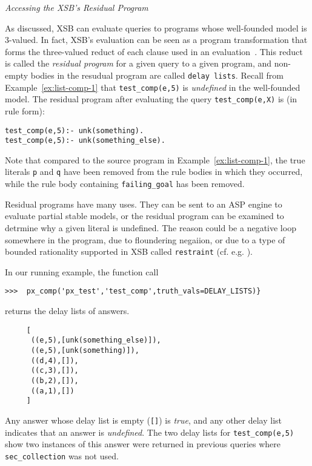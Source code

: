\begin{example} \rm {\it Accessing the XSB's Residual Program} \label{ex:px-comp-undef}

As discussed, XSB can evaluate queries to programs whose well-founded
model is 3-valued.  In fact, XSB's evaluation can be seen as a program
transformation that forms the three-valued reduct of each clause used
in an evaluation~\cite{ChWa96}.  This reduct is called the {\em
  residual program} for a given query to a given program, and
non-empty bodies in the resudual program are called {\tt delay lists}.
Recall from Example~\ref{ex:list-comp-1} that {\tt test\_comp(e,5)} is
{\em undefined} in the well-founded model.  The residual program after
evaluating the query {\tt test\_comp(e,X)} is (in rule form):

\begin{verbatim}
test_comp(e,5):- unk(something).
test_comp(e,5):- unk(something_else).
\end{verbatim}

Note that compared to the source program in
Example~\ref{ex:list-comp-1}, the true literals {\tt p} and {\tt q}
have been removed from the rule bodies in which they occurred, while
the rule body containing {\tt failing\_goal} has been removed.

Residual programs have many uses.  They can be sent to an ASP engine
to evaluate partial stable models, or the residual program can be
examined to detrmine why a given literal is undefined. The reason
could be a negative loop somewhere in the program, due to floundering
negaiion, or due to a type of bounded rationality supported in XSB
called {\tt restraint} (cf. e.g. \cite{GroS13}).

In our running example, the function call

\begin{verbatim}  
>>>  px_comp('px_test','test_comp',truth_vals=DELAY_LISTS)}
\end{verbatim}

\noindent
returns the delay lists of answers.  

\begin{verbatim}
     [
      ((e,5),[unk(something_else)]),
      ((e,5),[unk(something)]),
      ((d,4),[]),
      ((c,3),[]),
      ((b,2),[]),
      ((a,1),[]) 
     ]
\end{verbatim}

Any answer whose delay list is empty ({\tt []}) is {\em true}, and any
other delay list indicates that an answer is {\em undefined}.  The two
delay lists for {\tt test\_comp(e,5)} show two instances of this
answer were returned in previous queries where {\tt sec\_collection}
was not used.
  \end{example}

